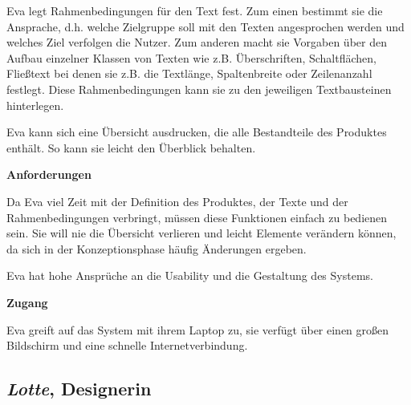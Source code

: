 \begin{multicols}{2}
Eva legt Rahmenbedingungen für den Text fest. Zum einen bestimmt sie die Ansprache, d.h. welche Zielgruppe soll mit den Texten angesprochen werden und welches Ziel verfolgen die Nutzer. Zum anderen macht sie Vorgaben über den Aufbau einzelner Klassen von Texten wie z.B. Überschriften, Schaltflächen, Fließtext bei denen sie z.B. die Textlänge, Spaltenbreite oder Zeilenanzahl festlegt. Diese Rahmenbedingungen kann sie zu den jeweiligen Textbausteinen hinterlegen.

Eva kann sich eine Übersicht ausdrucken, die alle Bestandteile des Produktes enthält. So kann sie leicht den Überblick behalten.

\textbf{Anforderungen}

Da Eva viel Zeit mit der Definition des Produktes, der Texte und der Rahmenbedingungen verbringt, müssen diese Funktionen einfach zu bedienen sein. Sie will nie die Übersicht verlieren und leicht Elemente verändern können, da sich in der Konzeptionsphase häufig Änderungen ergeben. 

Eva hat hohe Ansprüche an die Usability und die Gestaltung des Systems.

\textbf{Zugang}

Eva greift auf das System mit ihrem Laptop zu, sie verfügt über einen großen Bildschirm und eine schnelle Internetverbindung.

\end{multicols}

\pagebreak

\subsection{\emph{Lotte}, Designerin}\label{p:lotte}

